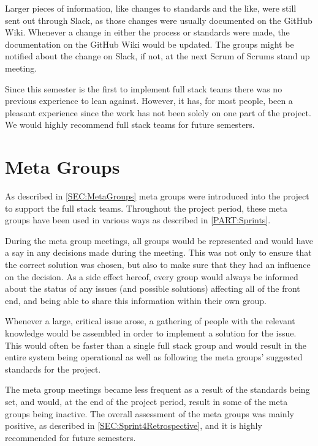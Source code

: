 Larger pieces of information, like changes to standards and the like, were still sent out through Slack, as those changes were usually documented on the GitHub Wiki.
Whenever a change in either the process or standards were made, the documentation on the GitHub Wiki would be updated. 
The groups might be notified about the change on Slack, if not, at the next Scrum of Scrums stand up meeting.

Since this semester is the first to implement full stack teams there was no previous experience to lean against. 
However, it has, for most people, been a pleasant experience since the work has not been solely on one part of the project.
We would highly recommend full stack teams for future semesters.

\section{Meta Groups}
As described in \autoref{SEC:MetaGroups} meta groups were introduced into the project to support the full stack teams.
Throughout the project period, these meta groups have been used in various ways as described in \autoref{PART:Sprints}. 

During the meta group meetings, all groups would be represented and would have a say in any decisions made during the meeting.
This was not only to ensure that the correct solution was chosen, but also to make sure that they had an influence on the decision.
As a side effect hereof, every group would always be informed about the status of any issues (and possible solutions) affecting all of the front end, and being able to share this information within their own group.

Whenever a large, critical issue arose, a gathering of people with the relevant knowledge would be assembled in order to implement a solution for the issue. 
This would often be faster than a single full stack group and would result in the entire system being operational as well as following the meta groups' suggested standards for the project.
  
The meta group meetings became less frequent as a result of the standards being set, and would, at the end of the project period, result in some of the meta groups being inactive.
The overall assessment of the meta groups was mainly positive, as described in \autoref{SEC:Sprint4Retrospective}, and it is highly recommended for future semesters.
